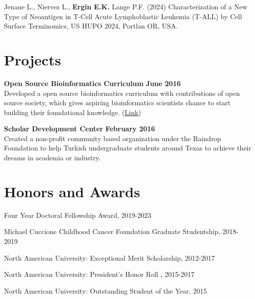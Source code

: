 \documentclass[margin,line]{res}
\begin{document}
\begin{resume}
Jenane L., Niervez L., {\bf Ergin E.K.} Lange P.F. (2024) Characterization of a New Type of Neoantigen in T-Cell Acute Lymphoblastic Leukemia (T-ALL) by Cell Surface Terminomics, US HUPO 2024, Portlan OR, USA.


\section{\sc Projects}


{\bf Open Source Bioinformatics Curriculum} \hfill {\bf June  2016}\\
Developed a open source bioinformatics curriculum with contributions of open source society, which gives aspiring bioinformatics scientists chance to start building their foundational knowledge. (\href{https://github.com/open-source-society/bioinformatics}{Link})

{\bf Scholar Development Center} \hfill {\bf February  2016}\\
Created a non-profit community based organization under the Raindrop Foundation to help Turkish undergraduate students around Texas to achieve their dreams in academia or industry.

\vspace{\baselineskip}

\section{\sc Honors and Awards}

Four Year Doctoral Fellowship Award, 2019-2023

\vspace*{-2.5mm}

Michael Cuccione Childhood Cancer Foundation Graduate Studentship, 2018-2019

\vspace*{-2.5mm}
North American University: Exceptional Merit Scholarship, 2012-2017

\vspace*{-2.5mm}
North American University: President's Honor Roll , 2015-2017

\vspace*{-2.5mm}
North American University: Outstanding Student of the Year, 2015



\end{resume}
\end{document}
